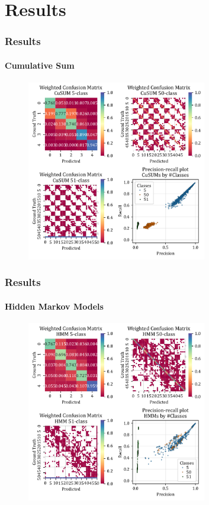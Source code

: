 \documentclass[xcolor={svgnames,table},10pt,fleqn]{beamer}
\begin{document}
\section{Results}
\begin{frame}
    \frametitle{Results}
    \framesubtitle{Cumulative Sum}
    \begin{figure}[h]
        \centering
        \includegraphics[width=0.7\textwidth]{imgs/05_mean_conf_mat_cusum.pdf}
    \end{figure}
\end{frame}

\begin{frame}
    \frametitle{Results}
    \framesubtitle{Hidden Markov Models}
    \begin{figure}[h]
        \centering
        \includegraphics[width=0.7\textwidth]{imgs/05_mean_conf_mat_hmm.pdf}
    \end{figure}
\end{frame}
\end{document}
